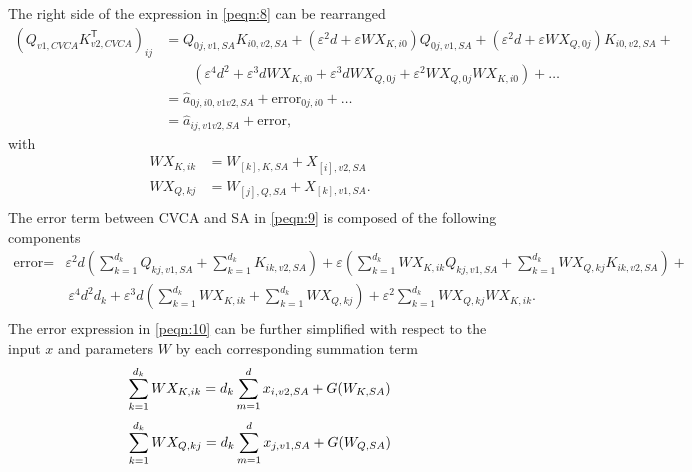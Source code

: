 The right side of the expression in \ref{peqn:8} can be rearranged
\begin{align}
    (Q_{v1,CVCA} K_{v2,CVCA}^{\mathsf{T}})_{ij} & = Q_{0j,v1,SA} K_{i0,v2,SA} + (\varepsilon^2 d + \varepsilon WX_{K,i0}) Q_{0j,v1,SA} + (\varepsilon^2 d + \varepsilon WX_{Q,0j}) K_{i0,v2,SA} + \nonumber \\
    &\qquad (\varepsilon^4 d^2 + \varepsilon^3 d WX_{K,i0} + \varepsilon^3 d WX_{Q,0j} + \varepsilon^2 WX_{Q,0j} WX_{K,i0}) + \dots \nonumber \\
    & = \hat{a}_{0j,i0,v1v2,SA} + \text{error}_{0j,i0} + \dots \nonumber \\
    & = \hat{a}_{ij,v1v2,SA} + \text{error}, \label{peqn:9}
\end{align}
with
\begin{equation*}
\begin{aligned}
    WX_{K,ik} & = W_{[k],K,SA} + X_{[i],v2,SA} \\
    WX_{Q,kj} & = W_{[j],Q,SA} + X_{[k],v1,SA}. \\
\end{aligned}
\end{equation*}
The error term between CVCA and SA in \ref{peqn:9} is composed of the following components
\begin{equation}
\begin{aligned}
    \text{error} = & \varepsilon^2 d (\sum_{k=1}^{d_k} Q_{kj,v1,SA} + \sum_{k=1}^{d_k} K_{ik,v2,SA}) + \varepsilon (\sum_{k=1}^{d_k} WX_{K,ik} Q_{kj,v1,SA} + \sum_{k=1}^{d_k} WX_{Q,kj} K_{ik,v2,SA}) + \\
    &\ \varepsilon^4 d^2 d_k + \varepsilon^3 d (\sum_{k=1}^{d_k} WX_{K,ik} + \sum_{k=1}^{d_k} WX_{Q,kj}) + \varepsilon^2 \sum_{k=1}^{d_k} WX_{Q,kj} WX_{K,ik}. \\
\end{aligned}
\label{peqn:10}
\end{equation}
The error expression in \ref{peqn:10} can be further simplified with respect to the input $x$ and parameters $W$ by each corresponding summation term
\begin{equation}
    \sum_{k=1}^{d_k} WX_{K,ik} = d_k \sum_{m=1}^{d} x_{i,v2,SA} + G(W_{K,SA}) \\
\label{peqn:11}
\end{equation}
\begin{equation}
    \sum_{k=1}^{d_k} WX_{Q,kj} = d_k \sum_{m=1}^{d} x_{j,v1,SA} + G(W_{Q,SA}) \\
\label{peqn:12}
\end{equation}
